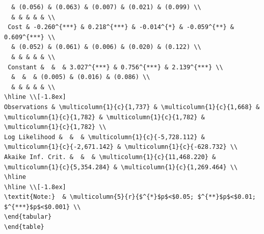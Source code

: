\documentclass[
  number,
  preprint,
  3p,
  onecolumn]{elsarticle}
\begin{document}
\begin{table}
{\begin{verbatim}
  & (0.056) & (0.063) & (0.007) & (0.021) & (0.099) \\ 
  & & & & & \\ 
 Cost & -0.260^{***} & 0.218^{***} & -0.014^{*} & -0.059^{**} & 0.609^{***} \\ 
  & (0.052) & (0.061) & (0.006) & (0.020) & (0.122) \\ 
  & & & & & \\ 
 Constant &  &  & 3.027^{***} & 0.756^{***} & 2.139^{***} \\ 
  &  &  & (0.005) & (0.016) & (0.086) \\ 
  & & & & & \\ 
\hline \\[-1.8ex] 
Observations & \multicolumn{1}{c}{1,737} & \multicolumn{1}{c}{1,668} & \multicolumn{1}{c}{1,782} & \multicolumn{1}{c}{1,782} & \multicolumn{1}{c}{1,782} \\ 
Log Likelihood &  &  & \multicolumn{1}{c}{-5,728.112} & \multicolumn{1}{c}{-2,671.142} & \multicolumn{1}{c}{-628.732} \\ 
Akaike Inf. Crit. &  &  & \multicolumn{1}{c}{11,468.220} & \multicolumn{1}{c}{5,354.284} & \multicolumn{1}{c}{1,269.464} \\ 
\hline 
\hline \\[-1.8ex] 
\textit{Note:}  & \multicolumn{5}{r}{$^{*}$p$<$0.05; $^{**}$p$<$0.01; $^{***}$p$<$0.001} \\ 
\end{tabular} 
\end{table} 
\end{verbatim}

}

\end{table}%
\end{document}
